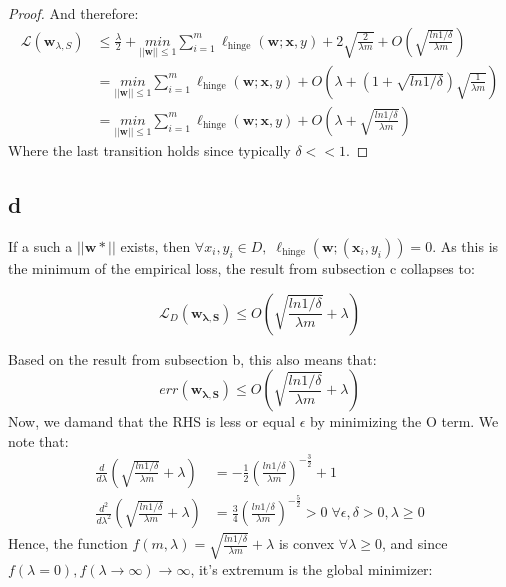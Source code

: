 \begin{proof}
    And therefore:
    \begin{equation*}
        \begin{split}      
            \mathcal{L}(\boldsymbol{w}_{\lambda, S}) &\leq \frac{\lambda}{2} + \underset{||\boldsymbol{w}||\leq 1}{min} \sum_{i=1}^m \ell_{\text{hinge}}(\boldsymbol{w}; \boldsymbol{x}, y) + 2 \sqrt{\frac{2}{\lambda m}} + O\left(\sqrt{\frac{ln 1/\delta}{\lambda m}} \right) \\
            &= \underset{||\boldsymbol{w}||\leq 1}{min} \sum_{i=1}^m \ell_{\text{hinge}}(\boldsymbol{w}; \boldsymbol{x}, y) + O\left(\lambda + \left(1 + \sqrt{ln 1/\delta}\right)\sqrt{\frac{1}{\lambda m}} \right) \\
            &= \underset{||\boldsymbol{w}||\leq 1}{min} \sum_{i=1}^m \ell_{\text{hinge}}(\boldsymbol{w}; \boldsymbol{x}, y) + O\left(\lambda + \sqrt{\frac{ln 1/\delta}{\lambda m}} \right)
        \end{split}
    \end{equation*}
    Where the last transition holds since typically $\delta << 1$.
\end{proof}

\subsection*{d}
If a such a $||\boldsymbol{w*}||$ exists, then $\forall x_i, y_i \in D, \; \ell_{\text{hinge}}(\boldsymbol{w};(\boldsymbol{x}_i, y_i)) = 0 $. As this is the minimum of the empirical loss, the result from subsection c collapses to:

\begin{equation*}
    \mathcal{L}_D(\boldsymbol{w_{\lambda, S}}) \leq O\left(\sqrt{\frac{ln 1/\delta}{\lambda m}} + \lambda \right)
\end{equation*}

Based on the result from subsection b, this also means that:
\begin{equation*}
    err(\boldsymbol{w_{\lambda, S}}) \leq O\left(\sqrt{\frac{ln 1/\delta}{\lambda m}} + \lambda \right)
\end{equation*}
Now, we damand that the RHS is less or equal $\epsilon$ by minimizing the O term.
We note that:
\begin{equation*}
    \begin{split}
        \frac{d}{d\lambda} \left(\sqrt{\frac{ln 1/\delta}{\lambda m}} + \lambda\right) &= -\frac{1}{2} (\frac{ln 1/\delta}{\lambda m})^{-\frac{3}{2}} + 1 \\
        \frac{d^2}{d\lambda^2} \left(\sqrt{\frac{ln 1/\delta}{\lambda m}} + \lambda\right) &= 
        \frac{3}{4} (\frac{ln 1/\delta}{\lambda m})^{-\frac{5}{2}} > 0 \; \forall \epsilon, \delta > 0, \lambda \geq 0
    \end{split}
\end{equation*}
Hence, the function $f(m, \lambda) = \sqrt{\frac{ln 1/\delta}{\lambda m}} + \lambda$ is convex $\forall \lambda \geq 0$, and since $f(\lambda=0), f(\lambda \rightarrow \infty) \rightarrow \infty$, it's extremum is the global minimizer:


